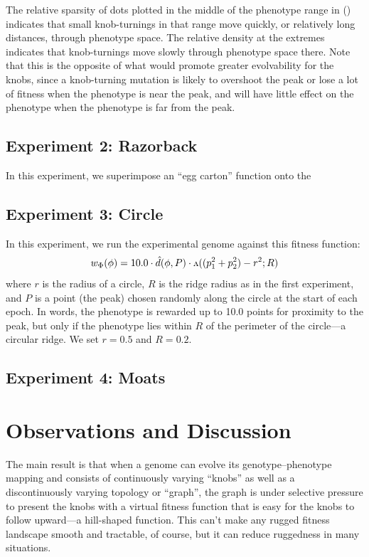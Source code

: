 \documentclass[letterpaper]{article}
\newcommand{\invv}{\ensuremath{\rotatebox[origin=c]{180}{\textrm{v}}}\xspace}
\begin{document}
The relative sparsity of dots plotted in the middle of the phenotype range
in () indicates that small knob-turnings in that range
move quickly, or relatively long distances, through phenotype space. The
relative density at the extremes indicates that knob-turnings move slowly
through phenotype space there. Note that this is the opposite of what would
promote greater evolvability for the knobs, since a knob-turning mutation is
likely to overshoot the peak or lose a lot of fitness when the phenotype is
near the peak, and will have little effect on the phenotype when the phenotype
is far from the peak.

\subsection{Experiment 2: Razorback}

In this experiment, we superimpose an ``egg carton'' function onto the 

\subsection{Experiment 3: Circle}

In this experiment, we run the experimental genome against this fitness
function:
\[
  w_\Phi(\phi) = 10.0 \cdot \hat{d}(\phi, P)
                      \cdot \invv((p_1^2 + p_2^2) - r^2; R)
\]
where $r$ is the radius of a circle, $R$ is the ridge radius as in the first
experiment, and $P$ is a point (the peak) chosen randomly along the circle
at the start of each epoch. In words, the phenotype is rewarded up to 10.0
points for proximity to the peak, but only if the phenotype lies within $R$
of the perimeter of the circle---a circular ridge. We set $r=0.5$ and $R=0.2$.

\subsection{Experiment 4: Moats}

\section{Observations and Discussion}

The main result is that when a genome can evolve its genotype--phenotype
mapping and consists of continuously varying ``knobs'' as well as a
discontinuously varying topology or ``graph'', the graph is under selective
pressure to present the knobs with a virtual fitness function that is easy for
the knobs to follow upward---a hill-shaped function. This can't make any
rugged fitness landscape smooth and tractable, of course, but it can reduce
ruggedness in many situations.
\end{document}

